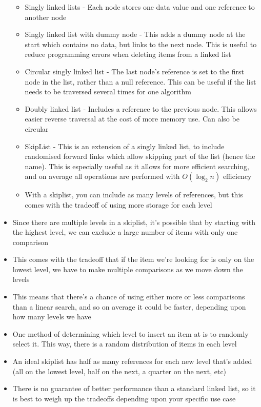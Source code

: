 \begin{itemize}
\begin{itemize}
    \item Singly linked lists - Each node stores one data value and one reference to another node
    \item Singly linked list with dummy node - This adds a dummy node at the start which contains no data, but links to the next node. This is useful to reduce programming errors when deleting items from a linked list
    \item Circular singly linked list - The last node's reference is set to the first node in the list, rather than a null reference. This can be useful if the list needs to be traversed several times for one algorithm
    \item Doubly linked list - Includes a reference to the previous node. This allows easier reverse traversal at the cost of more memory use. Can also be circular
    \item SkipList - This is an extension of a singly linked list, to include randomised forward links which allow skipping part of the list (hence the name). This is especially useful as it allows for more efficient searching, and on average all operations are performed with $O(\log_2 n)$ efficiency
    \item With a skiplist, you can include as many levels of references, but this comes with the tradeoff of using more storage for each level
  \end{itemize}
  \item Since there are multiple levels in a skiplist, it's possible that by starting with the highest level, we can exclude a large number of items with only one comparison
  \item This comes with the tradeoff that if the item we're looking for is only on the lowest level, we have to make multiple comparisons as we move down the levels
  \item This means that there's a chance of using either more or less comparisons than a linear search, and so on average it could be faster, depending upon how many levels we have
  \item One method of determining which level to insert an item at is to randomly select it. This way, there is a random distribution of items in each level
  \item An ideal skiplist has half as many references for each new level that's added (all on the lowest level, half on the next, a quarter on the next, etc)
  \item There is no guarantee of better performance than a standard linked list, so it is best to weigh up the tradeoffs depending upon your specific use case
\end{itemize}